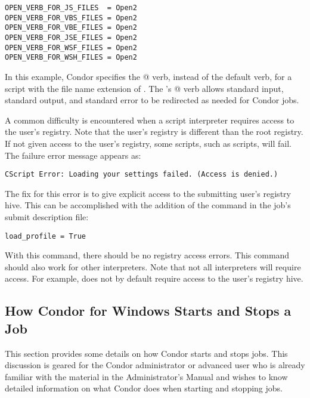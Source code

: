\begin{verbatim}
OPEN_VERB_FOR_JS_FILES  = Open2
OPEN_VERB_FOR_VBS_FILES = Open2
OPEN_VERB_FOR_VBE_FILES = Open2
OPEN_VERB_FOR_JSE_FILES = Open2
OPEN_VERB_FOR_WSF_FILES = Open2
OPEN_VERB_FOR_WSH_FILES = Open2
\end{verbatim}

In this example, Condor specifies the @ verb,
instead of the default \verb@Open@ verb,
for a script with the file name extension of \verb@wsh@.
The 's @ verb allows standard input,
standard output, and standard error to be redirected
as needed for Condor jobs.

A common difficulty is encountered when
a script interpreter requires access to the user's registry.
Note that the user's registry is different than the root registry.
If not given access to the user's registry,
some scripts, such as  scripts,
will fail.
The failure error message appears as: 

\begin{verbatim}
CScript Error: Loading your settings failed. (Access is denied.)
\end{verbatim}

The fix for this error is to give explicit access to the submitting
user's registry hive.  This can be accomplished with the addition of
the  command in the job's submit description
file:

\begin{verbatim}
load_profile = True
\end{verbatim}

With this command,
there should be no registry access errors.
This command should also work for other interpreters.
Note that not all interpreters will require access.
For example,
 does not by default require access to the user's
registry hive.

\subsection{How Condor for Windows Starts and Stops a Job}

This section provides some details on how Condor starts and stops jobs.
This discussion is geared for the Condor administrator or advanced user who is
already familiar with the material in the Administrator's Manual
and wishes to know detailed information on what Condor does when
starting and stopping jobs.

